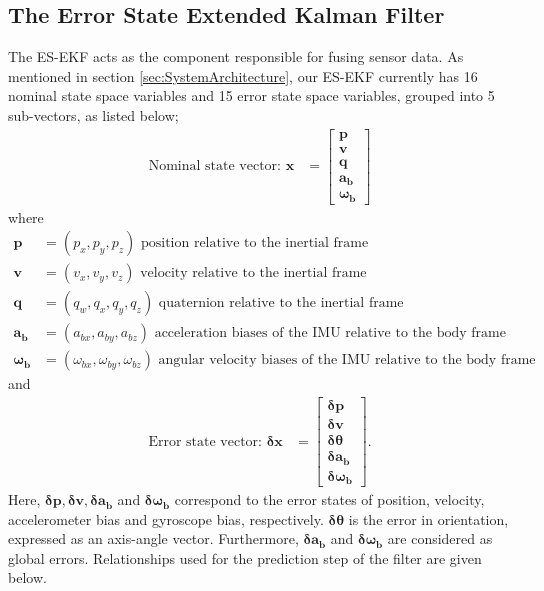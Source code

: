 \subsection{The Error State Extended Kalman Filter}
The \gls{ES-EKF} acts as the component responsible for fusing sensor data. As mentioned in section \ref{sec:SystemArchitecture}, our \gls{ES-EKF} currently has 16 nominal state space variables and 15 error state space variables, grouped into 5 sub-vectors, as listed below;
\begin{align}
    \text{Nominal state vector: }\textbf{x} &= \left[\begin{matrix}{}\textbf{p}\\\textbf{v}\\\textbf{q}\\\boldsymbol{a_b}\\\boldsymbol{\omega_b}\end{matrix}\right]
\end{align}
where
\begin{align}
    \textbf{p} &= (p_x, p_y, p_z) \text{ position relative to the inertial frame} \nonumber \\
    \textbf{v} &= (v_x, v_y, v_z) \text{ velocity relative to the inertial frame} \nonumber \\
    \textbf{q} &= (q_w, q_x, q_y, q_z) \text{ quaternion relative to the inertial frame} \nonumber \\
    \boldsymbol{a_b} &= (a_{bx}, a_{by}, a_{bz}) \text{ acceleration biases of the IMU relative to the body frame} \nonumber \\
    \boldsymbol{\omega_b} &= (\omega_{bx}, \omega_{by}, \omega_{bz}) \text{ angular velocity biases of the IMU relative to the body frame}\nonumber
\end{align}
and
\begin{align}
	\text{Error state vector: }\boldsymbol{\delta}\textbf{x} &= \left[\begin{matrix}{}\boldsymbol{\delta}\textbf{p}\\\boldsymbol{\delta}\textbf{v}\\\boldsymbol{\delta}\boldsymbol{\theta}\\\boldsymbol{\delta}\boldsymbol{a_b}\\\boldsymbol{\delta}\boldsymbol{\omega_b}\end{matrix}\right].
\end{align}
Here, $\boldsymbol{\delta}\textbf{p}, \boldsymbol{\delta}\textbf{v}, \boldsymbol{\delta}\boldsymbol{a_b}$ and $\boldsymbol{\delta}\boldsymbol{\omega_b}$ correspond to the error states of position, velocity, accelerometer bias and gyroscope bias, respectively. $\boldsymbol{\delta}\boldsymbol{\theta}$ is the error in orientation, expressed as an axis-angle vector. Furthermore, $\boldsymbol{\delta}\boldsymbol{a_b}$ and $\boldsymbol{\delta}\boldsymbol{\omega_b}$ are considered as global errors. Relationships used for the prediction step of the filter are given below.\\
